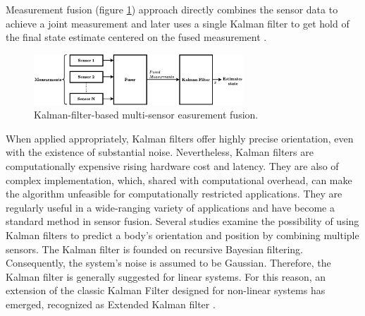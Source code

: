 Measurement fusion (figure \ref{fig:mesearurment_kalman}) approach directly combines the sensor data to achieve a joint measurement and later uses a single Kalman filter to get hold of the final state estimate centered on the fused measurement \cite{mosallaei2007process}.

\begin{figure}[!h]
    \centering
    \includegraphics[width=0.7\textwidth]{figures/kalman2.pdf}
    \caption{Kalman-filter-based multi-sensor easurement fusion. \cite{mosallaei2007process}}
    \label{fig:mesearurment_kalman}
\end{figure}

When applied appropriately, Kalman filters offer highly precise orientation, even with the existence of substantial noise. Nevertheless, Kalman filters are computationally expensive rising hardware cost and latency. They are also of complex implementation, which, shared with computational overhead, can make the algorithm unfeasible for computationally restricted applications. They are regularly useful in a wide-ranging variety of applications and have become a standard method in sensor fusion. Several studies examine the possibility of using Kalman filters to predict a body's orientation and position by combining multiple sensors. The Kalman filter is founded on recursive Bayesian filtering.
Consequently, the system's noise is assumed to be Gaussian. Therefore, the Kalman filter is generally suggested for linear systems. For this reason, an extension of the classic Kalman Filter designed for non-linear systems has emerged, recognized as Extended Kalman filter \cite{wilson2019formulation}.


